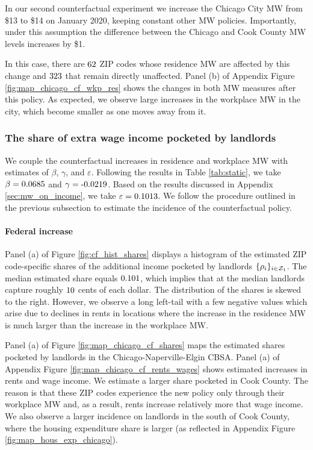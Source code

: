 In our second counterfactual experiment we increase the Chicago City MW 
from \$13 to \$14 on January 2020, keeping constant other MW policies.
Importantly, under this assumption the difference between the Chicago
and Cook County MW levels increases by \$1.

In this case, there are $\textnormal{62}$ ZIP codes whose 
residence MW are affected by this change and $\textnormal{323}$ 
that remain directly unaffected.
Panel (b) of Appendix Figure \ref{fig:map_chicago_cf_wkp_res} shows the changes 
in both MW measures after this policy.
As expected, we observe large increases in the workplace MW in the city, 
which become smaller as one moves away from it.

\subsubsection{The share of extra wage income pocketed by landlords}
\label{sec:cf_rents_and_wage_changes}

We couple the counterfactual increases in residence and workplace MW with 
estimates of $\beta$, $\gamma$, and $\varepsilon$.
Following the results in Table \ref{tab:static}, we take 
$\beta = \textnormal{0.0685}$ and 
$\gamma = \textnormal{-0.0219}$.
Based on the results discussed in Appendix \ref{sec:mw_on_income}, we take
$\varepsilon = \textnormal{0.1013}$.
We follow the procedure outlined in the previous subsection to estimate the 
incidence of the counterfactual policy.

\paragraph{Federal increase}

Panel (a) of Figure \ref{fig:cf_hist_shares} displays a histogram 
of the estimated ZIP code-specific shares of the additional income pocketed by 
landlords $\{\rho_i\}_{i\in\mathcal{Z}_1}$.
The median estimated share equals $\textnormal{0.101}$, which implies that at the 
median landlords capture roughly $\textnormal{10}$ cents of each dollar.
The distribution of the shares is skewed to the right.
However, we observe a long left-tail with a few negative values which arise due 
to declines in rents in locations where the increase in the residence MW is much 
larger than the increase in the workplace MW.

Panel (a) of Figure \ref{fig:map_chicago_cf_shares} maps the estimated shares 
pocketed by landlords in the Chicago-Naperville-Elgin CBSA.
Panel (a) of Appendix Figure \ref{fig:map_chicago_cf_rents_wages} shows
estimated increases in rents and wage income.
We estimate a larger share pocketed in Cook County.
The reason is that these ZIP codes experience the new policy only through
their workplace MW and, as a result, rents increase relatively more that 
wage income.
We also observe a larger incidence on landlords in the south of Cook County,
where the housing expenditure share is larger 
(as reflected in Appendix Figure \ref{fig:map_hous_exp_chicago}).

